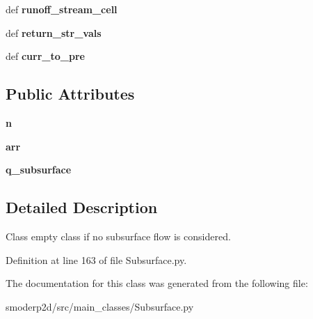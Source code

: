 \begin{DoxyCompactItemize}
\item 
\hypertarget{classsmoderp2d_1_1src_1_1main__classes_1_1Subsurface_1_1SubsurfacePass_a154be8d42dd279cf533545c7128697f0}{def {\bfseries runoff\-\_\-stream\-\_\-cell}}\label{classsmoderp2d_1_1src_1_1main__classes_1_1Subsurface_1_1SubsurfacePass_a154be8d42dd279cf533545c7128697f0}

\item 
\hypertarget{classsmoderp2d_1_1src_1_1main__classes_1_1Subsurface_1_1SubsurfacePass_aa803af6a9d76025033b00c980bf36961}{def {\bfseries return\-\_\-str\-\_\-vals}}\label{classsmoderp2d_1_1src_1_1main__classes_1_1Subsurface_1_1SubsurfacePass_aa803af6a9d76025033b00c980bf36961}

\item 
\hypertarget{classsmoderp2d_1_1src_1_1main__classes_1_1Subsurface_1_1SubsurfacePass_a061840e5785c980cde76b41a208792f9}{def {\bfseries curr\-\_\-to\-\_\-pre}}\label{classsmoderp2d_1_1src_1_1main__classes_1_1Subsurface_1_1SubsurfacePass_a061840e5785c980cde76b41a208792f9}

\end{DoxyCompactItemize}
\subsection*{Public Attributes}
\begin{DoxyCompactItemize}
\item 
\hypertarget{classsmoderp2d_1_1src_1_1main__classes_1_1Subsurface_1_1SubsurfacePass_a4e23f0e451462cff2809755e9fb5a9be}{{\bfseries n}}\label{classsmoderp2d_1_1src_1_1main__classes_1_1Subsurface_1_1SubsurfacePass_a4e23f0e451462cff2809755e9fb5a9be}

\item 
\hypertarget{classsmoderp2d_1_1src_1_1main__classes_1_1Subsurface_1_1SubsurfacePass_a821e396c68937e815cbc43b2bd14aaa9}{{\bfseries arr}}\label{classsmoderp2d_1_1src_1_1main__classes_1_1Subsurface_1_1SubsurfacePass_a821e396c68937e815cbc43b2bd14aaa9}

\item 
\hypertarget{classsmoderp2d_1_1src_1_1main__classes_1_1Subsurface_1_1SubsurfacePass_a014d041b86aea9a92b5d1bb46003234f}{{\bfseries q\-\_\-subsurface}}\label{classsmoderp2d_1_1src_1_1main__classes_1_1Subsurface_1_1SubsurfacePass_a014d041b86aea9a92b5d1bb46003234f}

\end{DoxyCompactItemize}


\subsection{Detailed Description}
Class empty class if no subsurface flow is considered. 

Definition at line 163 of file Subsurface.\-py.



The documentation for this class was generated from the following file\-:\begin{DoxyCompactItemize}
\item 
smoderp2d/src/main\-\_\-classes/Subsurface.\-py\end{DoxyCompactItemize}
